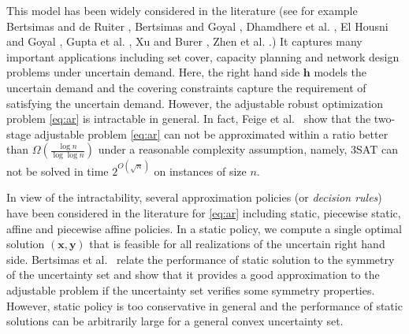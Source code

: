 \documentclass[moor]{informs1}              %
\newcommand{\mb}[1]{\ensuremath{\boldsymbol{#1}}}
\begin{document}
This model has been widely considered in the literature (see for example 
Bertsimas and de Ruiter \cite{bertsimas2016duality}, Bertsimas and Goyal \cite{BG10}, Dhamdhere et al. \cite{dhamdhere2005pay}, El Housni and Goyal \cite{NIPS2017_7061}, Gupta et al. \cite{gupta2014thresholded}, Xu and Burer \cite{Xu2018}, Zhen et al. \cite{zhen2016adjustable}.)
It captures many important applications including set cover, capacity planning and network design problems under uncertain demand. Here, the right hand side $\mb h$ models the uncertain demand and the covering constraints capture the requirement of satisfying the uncertain demand. However, the adjustable robust optimization problem \eqref{eq:ar} is intractable in general. In fact, Feige et al.~\cite{FJMM07} show that the two-stage adjustable  problem \eqref{eq:ar} can not be approximated within a ratio better than $\Omega(\frac{\log n}{\log \log n})$  under a reasonable complexity assumption, namely, 3SAT can not be solved in time $2^{O(\sqrt{n})}$ on instances of size $n$. 

In view of the intractability, several approximation policies (or \textit{decision rules}) have been considered in the literature for \eqref{eq:ar} including static, piecewise static, affine and piecewise affine policies. In a static policy, we compute a single optimal solution $(\mb{x},\mb{y})$ that is feasible for all realizations of the uncertain right hand side. Bertsimas et al.~\cite{BGS10}  relate the performance of static solution to the symmetry of the uncertainty set and show that it provides a good approximation to the adjustable problem if the uncertainty set verifies some symmetry properties. However, static policy is too conservative in general and the performance of static solutions can be arbitrarily large for a general convex uncertainty set. 
\end{document}
